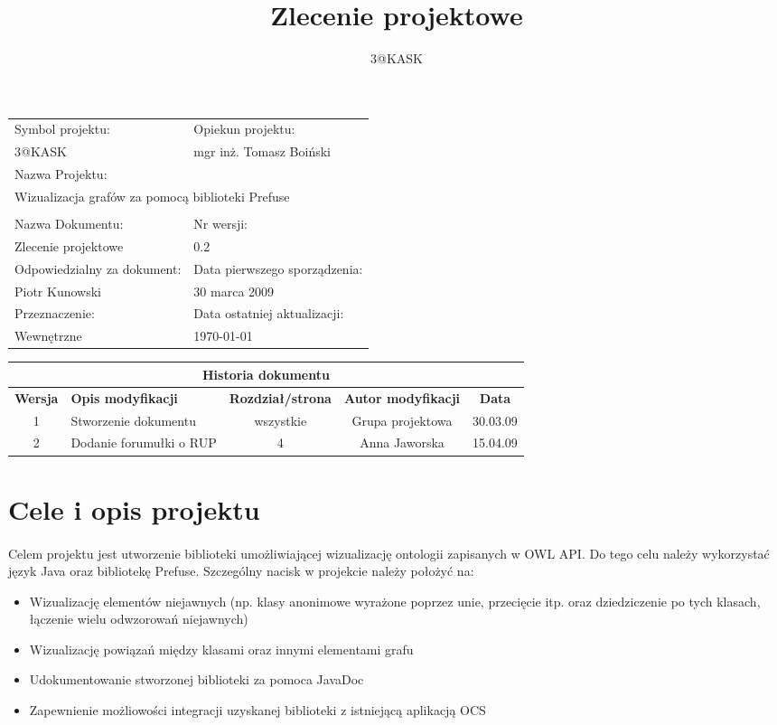 \documentclass[a4paper,10pt]{article}
\title{Zlecenie projektowe }
\author{3@KASK}
\begin{document}



\maketitle


\begin{center}
\begin{tabular}{|p{7cm}|p{7cm}|}
\hline
Symbol projektu: & Opiekun projektu:   \tabularnewline
3@KASK & mgr inż. Tomasz Boiński    \tabularnewline \hline
\multicolumn{2}{|l|}{Nazwa Projektu: } \tabularnewline
\multicolumn{2}{|l|}{Wizualizacja grafów za pomocą biblioteki Prefuse} \tabularnewline
\hline
\multicolumn{2}{l}{ } \tabularnewline %
\hline
Nazwa Dokumentu: & Nr wersji:   \tabularnewline
Zlecenie projektowe & 0.2 \tabularnewline \hline
Odpowiedzialny za dokument: & Data pierwszego sporządzenia:   \tabularnewline
Piotr Kunowski & 30 marca 2009 \tabularnewline \hline
Przeznaczenie: & Data ostatniej aktualizacji:   \tabularnewline
Wewnętrzne & \today \tabularnewline \hline
\end{tabular}
\end{center}

\begin{center}
\begin{tabular}{|c|p{4cm}|c|c|c|}
\multicolumn{5}{c}{\textbf{Historia dokumentu}} \tabularnewline \hline
\textbf{Wersja} & \textbf{Opis modyfikacji} & \textbf{Rozdział/strona} & \textbf{Autor modyfikacji} & \textbf{Data} \tabularnewline \hline
1 & Stworzenie dokumentu & wszystkie & Grupa projektowa & 30.03.09 \tabularnewline \hline
2 & Dodanie forumułki o RUP   & 4   & Anna Jaworska & 15.04.09\tabularnewline \hline
\end{tabular}


\end{center}


\newpage
\tableofcontents
\newpage

\section{Cele i opis projektu}
\paragraph{} Celem projektu jest utworzenie biblioteki umożliwiającej wizualizację ontologii zapisanych w OWL API. Do tego celu należy wykorzystać język Java oraz bibliotekę Prefuse. Szczególny nacisk w projekcie należy położyć na:
\begin{itemize}
 \item Wizualizację elementów niejawnych (np. klasy anonimowe wyrażone
poprzez unie, przecięcie itp. oraz dziedziczenie po tych klasach,
łączenie wielu odwzorowań niejawnych)
\item  Wizualizację powiązań między klasami oraz innymi elementami grafu
\item  Udokumentowanie stworzonej biblioteki za pomoca JavaDoc
\item  Zapewnienie możliowości integracji uzyskanej biblioteki z istniejącą aplikacją OCS
\end{itemize}
\end{document}
